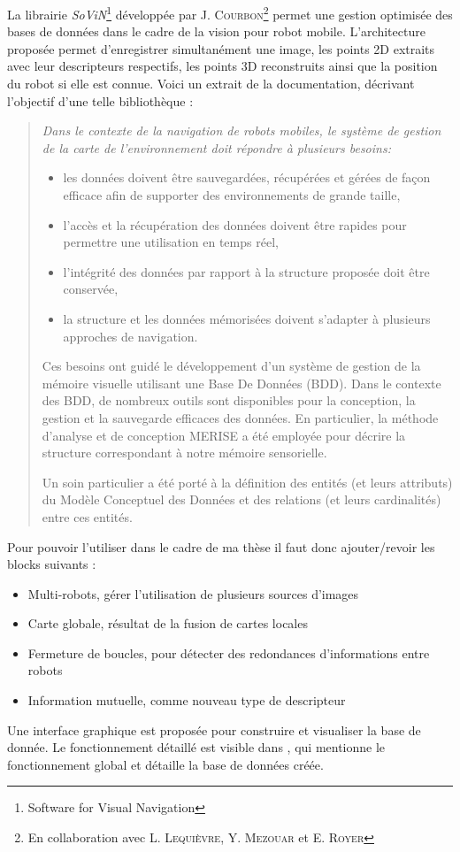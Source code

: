        
La librairie \emph{SoViN}\footnote{Software for Visual Navigation} développée par J. \textsc{Courbon}\footnote{En collaboration avec L. \textsc{Lequièvre}, Y. \textsc{Mezouar} et E. \textsc{Royer}} permet une gestion optimisée des bases de données dans le cadre de la vision pour robot mobile.
L'architecture proposée permet d'enregistrer simultanément une image, les points 2D extraits avec leur descripteurs respectifs, les points 3D reconstruits ainsi que la position du robot si elle est connue. Voici un extrait de la documentation, décrivant l'objectif d'une telle bibliothèque :
\begin{quote}
\it Dans le contexte de la navigation de robots mobiles, le système de gestion de la carte de l'environnement doit répondre à plusieurs besoins:
\begin{itemize}
\item les données doivent être sauvegardées, récupérées et gérées de façon efficace afin de supporter des environnements de grande taille,
\item l'accès et la récupération des données doivent être rapides pour permettre une utilisation en temps réel,
\item l'intégrité des données par rapport à la structure proposée doit être conservée,
\item la structure et les données mémorisées doivent s'adapter à plusieurs approches de navigation.
\end{itemize}

Ces besoins ont guidé le développement d'un système de gestion de la mémoire visuelle utilisant une Base De Données (BDD). Dans le contexte des BDD, de nombreux outils sont disponibles pour la conception, la gestion et la sauvegarde efficaces des données. En particulier, la méthode d'analyse et de conception MERISE a été employée pour décrire la structure correspondant à notre mémoire sensorielle.

Un soin particulier a été porté à la définition des entités (et leurs attributs) du Modèle Conceptuel des Données et des relations (et leurs cardinalités) entre ces entités.
\end{quote}

Pour pouvoir l'utiliser dans le cadre de ma thèse il faut donc ajouter/revoir les blocks suivants :
\begin{itemize}
\item Multi-robots, gérer l'utilisation de plusieurs sources d'images
\item Carte globale, résultat de la fusion de cartes locales
\item Fermeture de boucles, pour détecter des redondances d'informations entre robots
\item Information mutuelle, comme nouveau type de descripteur
\end{itemize}


Une interface graphique est proposée pour construire et visualiser la base de donnée.
Le fonctionnement détaillé est visible dans \cite{Lequievre08}, qui mentionne le fonctionnement global et détaille la base de données créée.
